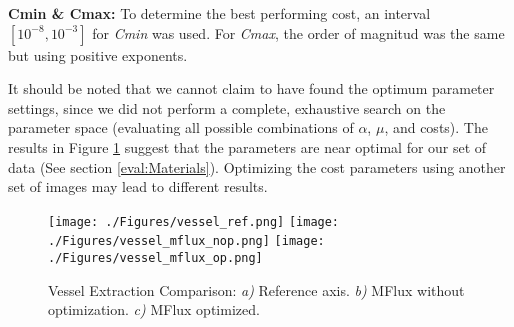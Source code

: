 \textbf{Cmin \& Cmax:} To determine the best performing cost, an interval $\left[  10^{-8}, 10^{-3}\right]$ for \textit{Cmin} was used. For \textit{Cmax}, the order of magnitud was the same but using positive exponents.

It should be noted that we cannot claim to have found the optimum parameter settings, since we did not perform a complete, exhaustive search on the parameter space (evaluating all possible combinations of $\alpha$, $\mu$, and costs). The results in Figure \ref{fig:ves_op} suggest that the parameters are near optimal for our set of data (See section \ref{eval:Materials}). Optimizing the cost parameters using another set of images may lead to different results.

\begin{figure}[ht]
	\centering
		\texttt{[image: ./Figures/vessel\_ref.png]}
		\texttt{[image: ./Figures/vessel\_mflux\_nop.png]}
		\texttt{[image: ./Figures/vessel\_mflux\_op.png]}
	\caption[Centerline Optimization]{Vessel Extraction Comparison: \textit{a)} Reference axis. \textit{b)} MFlux without optimization. \textit{c)} MFlux optimized.}
	\label{fig:ves_op}
\end{figure}